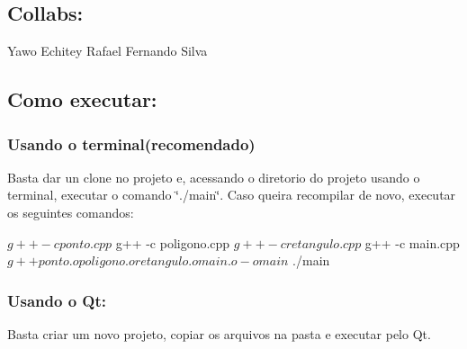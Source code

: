 \subsection*{Collabs\+:}

Yawo Echitey Rafael Fernando Silva

\subsection*{Como executar\+:}

\subsubsection*{Usando o terminal(recomendado)}

Basta dar un clone no projeto e, acessando o diretorio do projeto usando o terminal, executar o comando \char`\"{}./main\char`\"{}. Caso queira recompilar de novo, executar os seguintes comandos\+: 
\begin{DoxyCode}
$ g++ -c ponto.cpp
$ g++ -c poligono.cpp
$ g++ -c retangulo.cpp
$ g++ -c main.cpp
$ g++ ponto.o poligono.o retangulo.o main.o -o main
$ ./main
\end{DoxyCode}


\subsubsection*{Usando o Qt\+:}

Basta criar um novo projeto, copiar os arquivos na pasta e executar pelo Qt. 